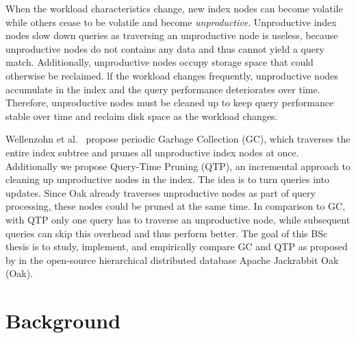 \documentclass[abstracton,12pt]{scrartcl}
\theoremstyle{definition}
\begin{document}
When the workload characteristics change, new index nodes can become volatile
while others cease to be volatile and become \textit{unproductive}. Unproductive
index nodes slow down queries as traversing an unproductive node is useless,
because unproductive nodes do not contains any data 
and thus cannot yield a query match. Additionally, unproductive nodes
occupy storage space that could otherwise be reclaimed. lf the workload changes
frequently, unproductive nodes accumulate in the index and the query
performance deteriorates over time. Therefore, unproductive nodes must be
cleaned up to keep query performance stable over time and reclaim disk space as
the workload changes.

Wellenzohn et al.~\cite{KW17} propose periodic Garbage Collection (GC), which
traverses the entire index subtree and prunes all unproductive index nodes at
once. Additionally we propose Query-Time Pruning (QTP), an incremental approach
to cleaning up unproductive nodes in the index. The idea is to turn queries into
updates. Since Oak already traverses unproductive nodes as part of query
processing, these nodes could be pruned at the same time. In comparison to GC,
with QTP only one query has to traverse an unproductive node, while subsequent
queries can skip this overhead and thus perform better.
The goal of this BSc thesis is to study, implement, and empirically compare GC
and QTP as proposed by \cite{KW17} in the open-source hierarchical distributed
database Apache Jackrabbit Oak (Oak).

\section{Background}



\end{document}
